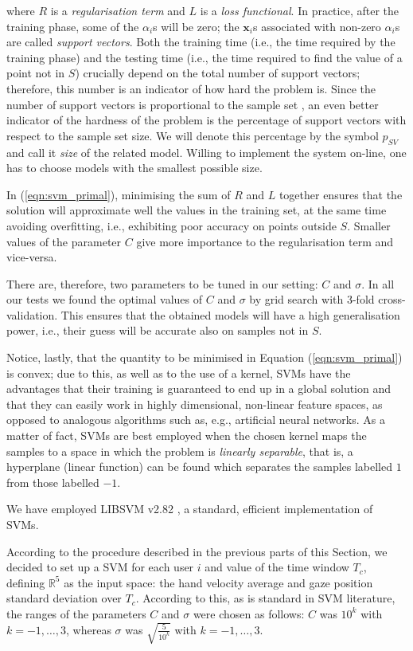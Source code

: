 \documentclass{article}
\def\RR{\mathbb{R}}
\def\xx{\mathbf{x}}
\begin{document}
\noindent where $R$ is a \emph{regularisation term} and $L$ is a
\emph{loss functional}. In practice, after the training phase, some of
the $\alpha_i$s will be zero; the $\xx_i$s associated with non-zero
$\alpha_i$s are called \emph{support vectors}. Both the training time
(i.e., the time required by the training phase) and the testing time
(i.e., the time required to find the value of a point not in $S$)
crucially depend on the total number of support vectors; therefore,
this number is an indicator of how hard the problem is. Since the
number of support vectors is proportional to the sample set
\cite{Steinwart03}, an even better indicator of the hardness of the
problem is the percentage of support vectors with respect to the
sample set size. We will denote this percentage by the symbol $p_{SV}$
and call it \emph{size} of the related model. Willing to implement the
system on-line, one has to choose models with the smallest possible
size.

In (\ref{eqn:svm_primal}), minimising the sum of $R$ and $L$ together
ensures that the solution will approximate well the values in the
training set, at the same time avoiding overfitting, i.e., exhibiting
poor accuracy on points outside $S$. Smaller values of the parameter
$C$ give more importance to the regularisation term and vice-versa.

There are, therefore, two parameters to be tuned in our setting: $C$
and $\sigma$. In all our tests we found the optimal values of $C$ and
$\sigma$ by grid search with $3$-fold cross-validation. This ensures
that the obtained models will have a high generalisation power, i.e.,
their guess will be accurate also on samples not in $S$.

Notice, lastly, that the quantity to be minimised in Equation
(\ref{eqn:svm_primal}) is convex; due to this, as well as to the use
of a kernel, SVMs have the advantages that their training is
guaranteed to end up in a global solution and that they can easily
work in highly dimensional, non-linear feature spaces, as opposed to
analogous algorithms such as, e.g., artificial neural networks. As a
matter of fact, SVMs are best employed when the chosen kernel maps the
samples to a space in which the problem is \emph{linearly separable},
that is, a hyperplane (linear function) can be found which separates
the samples labelled $1$ from those labelled $-1$.

We have employed LIBSVM v2.82 \cite{ChangL01}, a standard, efficient
implementation of SVMs.

According to the procedure described in the previous parts of this
Section, we decided to set up a SVM for each user $i$ and value of the
time window $T_c$, defining $\RR^{5}$ as the input space: the hand
velocity average and gaze position standard deviation over
$T_c$. According to this, as is standard in SVM literature, the ranges
of the parameters $C$ and $\sigma$ were chosen as follows: $C$ was
$10^k$ with $k=-1,\ldots,3$, whereas $\sigma$ was
$\sqrt{\frac{5}{10^{k}}}$ with $k=-1,\ldots,3$.
\end{document}
